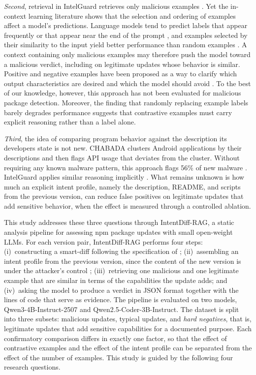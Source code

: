 \documentclass[a4paper,fleqn]{cas-dc}
\begin{document}
\emph{Second}, retrieval in IntelGuard retrieves only malicious examples \citep{guo2026bridging}. Yet the in-context learning literature shows that the selection and ordering of examples affect a model's predictions. Language models tend to predict labels that appear frequently or that appear near the end of the prompt \citep{zhao2021calibrate}, and examples selected by their similarity to the input yield better performance than random examples \citep{liu2022makes}. A context containing only malicious examples may therefore push the model toward a malicious verdict, including on legitimate updates whose behavior is similar. Positive and negative examples have been proposed as a way to clarify which output characteristics are desired and which the model should avoid \citep{gao2024customizing}. To the best of our knowledge, however, this approach has not been evaluated for malicious package detection. Moreover, the finding that randomly replacing example labels barely degrades performance \citep{min2022rethinking} suggests that contrastive examples must carry explicit reasoning rather than a label alone.

\emph{Third}, the idea of comparing program behavior against the description its developers state is not new. CHABADA clusters Android applications by their descriptions and then flags API usage that deviates from the cluster. Without requiring any known malware pattern, this approach flags 56\% of new malware \citep{gorla2014checking}. IntelGuard applies similar reasoning implicitly \citep{guo2026bridging}. What remains unknown is how much an explicit intent profile, namely the description, README, and scripts from the previous version, can reduce false positives on legitimate updates that add sensitive behavior, when the effect is measured through a controlled ablation.

This study addresses these three questions through IntentDiff-RAG, a static analysis pipeline for assessing npm package updates with small open-weight LLMs. For each version pair, IntentDiff-RAG performs four steps: (i)~constructing a smart-diff following the specification of \citet{wyss2025evaluating}; (ii)~assembling an intent profile from the previous version, since the content of the new version is under the attacker's control \citep{wyss2025evaluating}; (iii)~retrieving one malicious and one legitimate example that are similar in terms of the capabilities the update adds; and (iv)~asking the model to produce a verdict in JSON format together with the lines of code that serve as evidence. The pipeline is evaluated on two models, Qwen3-4B-Instruct-2507 and Qwen2.5-Coder-3B-Instruct. The dataset is split into three subsets: malicious updates, typical updates, and \emph{hard negatives}, that is, legitimate updates that add sensitive capabilities for a documented purpose. Each confirmatory comparison differs in exactly one factor, so that the effect of contrastive examples and the effect of the intent profile can be separated from the effect of the number of examples. This study is guided by the following four research questions.
\end{document}

